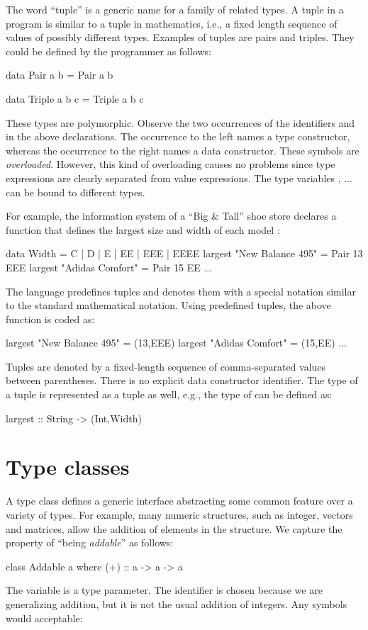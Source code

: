 The word ``tuple'' is a generic name
for a family of related types.
A tuple in a program is similar to
a tuple in mathematics, i.e., a fixed
length sequence of values of possibly different types.
Examples of tuples are pairs and triples.
They could be defined by the programmer as follows:
%
\begin{curry}
data Pair a b = Pair a b

data Triple a b c = Triple a b c
\end{curry}
%
These types are polymorphic.  Observe the two occurrences of
the identifiers  and  in the above declarations.
The occurrence to the left names a type constructor,
whereas the occurrence to the right names a data constructor.
These symbols are \emph{overloaded}.
However, this kind of overloading causes no problems since
type expressions are clearly separated from value expressions.
The type variables , $\ldots$ can be bound
to different types.

For example, the information system of a ``Big \& Tall'' shoe store
declares a function that defines the largest size and width of each model
:
%
\begin{curry}
data Width = C | D | E | EE | EEE | EEEE
largest "New Balance 495" = Pair 13 EEE
largest "Adidas Comfort"  = Pair 15 EE
...
\end{curry}
%
The language predefines tuples and denotes them with a special
notation similar to the standard mathematical notation.
Using predefined tuples, the above function is coded as:
%
\begin{curry}
largest "New Balance 495" = (13,EEE)
largest "Adidas Comfort"  = (15,EE)
...
\end{curry}
%
Tuples are denoted by a fixed-length sequence of comma-separated
values between parentheses.
There is no explicit data constructor identifier.
The type of a tuple is represented
as a tuple as well, e.g., the type of 
can be defined as:
%
\begin{curry}
largest :: String -> (Int,Width)
\end{curry}
%

\section{Type classes}
\label{Type classes}


A type class defines a generic interface abstracting
some common feature over a variety of types.
For example, many numeric structures, such as integer,
vectors and matrices, allow the addition of elements in the structure.
We capture the property of ``being \emph{addable}'' as follows:
%
\begin{curry}
class Addable a where
  (+) :: a ->  a  -> a
\end{curry}
%
The variable  is a type parameter.
The identifier \ccode{+} is chosen because we are generalizing
addition, but it is not the usual addition of integers.
Any symbols would acceptable:

